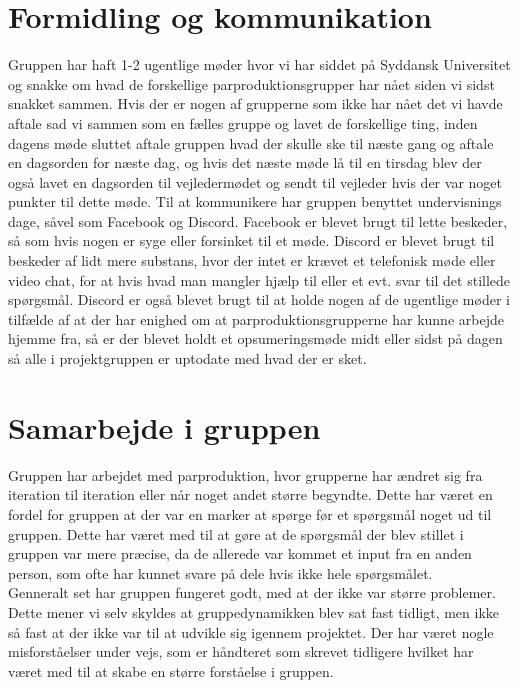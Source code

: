 \section{Formidling og kommunikation}
Gruppen har haft 1-2 ugentlige møder hvor vi har siddet på Syddansk Universitet og snakke om hvad de forskellige parproduktionsgrupper har nået siden vi sidst snakket sammen. Hvis der er nogen af grupperne som ikke har nået det vi havde aftale sad vi sammen som en fælles gruppe og lavet de forskellige ting, inden dagens møde sluttet aftale gruppen hvad der skulle ske til næste gang og aftale en dagsorden for næste dag, og hvis det næste møde lå til en tirsdag blev der også lavet en dagsorden til vejledermødet og sendt til vejleder hvis der var noget punkter til dette møde. Til at kommunikere har gruppen benyttet undervisnings dage, såvel som Facebook og Discord. Facebook er blevet brugt til lette beskeder, så som hvis nogen er syge eller forsinket til et møde. Discord er blevet brugt til beskeder af lidt mere substans, hvor der intet er krævet et telefonisk møde eller video chat, for at hvis hvad man mangler hjælp til eller et evt. svar til det stillede spørgsmål. Discord er også blevet brugt til at holde nogen af de ugentlige møder i tilfælde af at der har enighed om at parproduktionsgrupperne har kunne arbejde hjemme fra, så er der blevet holdt et opsumeringsmøde midt eller sidst på dagen så alle i projektgruppen er uptodate med hvad der er sket.
\section{Samarbejde i gruppen}
Gruppen har arbejdet med parproduktion, hvor grupperne har ændret sig fra iteration til iteration eller når noget andet større begyndte. Dette har været en fordel for gruppen at der var en marker at spørge før et spørgsmål noget ud til gruppen. Dette har været med til at gøre at de spørgsmål der blev stillet i gruppen var mere præcise, da de allerede var kommet et input fra en anden person, som ofte har kunnet svare på dele hvis ikke hele spørgsmålet. \\
Genneralt set har gruppen fungeret godt, med at der ikke var større problemer. Dette mener vi selv skyldes at gruppedynamikken blev sat fast tidligt, men ikke så fast at der ikke var til at udvikle sig igennem projektet. Der har været nogle misforståelser under vejs, som er håndteret som skrevet tidligere hvilket har været med til at skabe en større forståelse i gruppen. 
